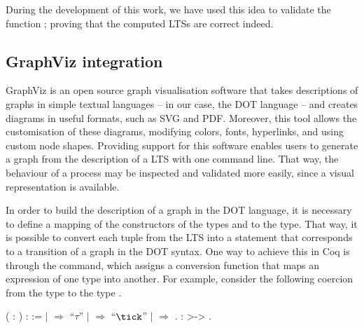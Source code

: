 During the development of this work, we have used this idea to validate the function ; proving that the computed LTSs are correct indeed.

\subsection{GraphViz integration}

GraphViz is an open source graph visualisation software that takes descriptions of graphs in simple textual languages -- in our case, the DOT language -- and creates diagrams in useful formats, such as SVG and PDF. Moreover, this tool allows the customisation of these diagrams, modifying colors, fonts, hyperlinks, and using custom node shapes. Providing support for this software enables \CSPcoq{} users to generate a graph from the description of a LTS with one command line. That way, the behaviour of a process may be inspected and validated more easily, since a visual representation is available.

In order to build the description of a graph in the DOT language, it is necessary to define a mapping of the constructors of the types  and  to the  type. That way, it is possible to convert each tuple from the LTS into a statement that corresponds to a transition of a graph in the DOT syntax. One way to achieve this in Coq is through the  command, which assigns a conversion function that maps an expression of one type into another. For example, consider the following coercion from the type  to the type .

\begin{coqdoccode}
	\coqdocnoindent
	  ( : ) :  :=\coqdoceol
	\coqdocindent{1.00em}
	  \coqdoceol
	\coqdocindent{1.00em}
	\ensuremath{|}  \ensuremath{\Rightarrow} ``$ \tau $''\coqdoceol
	\coqdocindent{1.00em}
	\ensuremath{|}  \ensuremath{\Rightarrow} ``$ \tick $''\coqdoceol
	\coqdocindent{1.00em}
	\ensuremath{|}   \ensuremath{\Rightarrow} \coqdoceol
	\coqdocindent{1.00em}
	.\coqdoceol
	\coqdocemptyline
	\coqdocnoindent
	  :  >-> .\coqdoceol
\end{coqdoccode}

